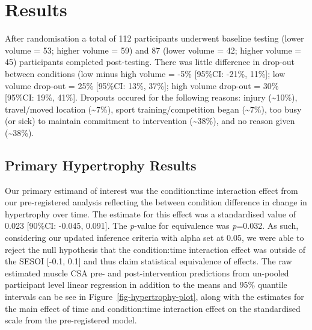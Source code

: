 \documentclass[
]{article}
\begin{document}
\section{Results}\label{results}

After randomisation a total of 112 participants underwent baseline
testing (lower volume = 53; higher volume = 59) and 87 (lower volume =
42; higher volume = 45) participants completed post-testing. There was
little difference in drop-out between conditions (low minus high volume
= -5\% {[}95\%CI: -21\%, 11\%{]}; low volume drop-out = 25\% {[}95\%CI:
13\%, 37\%{]}; high volume drop-out = 30\% {[}95\%CI: 19\%, 41\%{]}.
Dropouts occured for the following reasons: injury
(\textasciitilde10\%), travel/moved location (\textasciitilde7\%), sport
training/competition began (\textasciitilde7\%), too busy (or sick) to
maintain commitment to intervention (\textasciitilde38\%), and no reason
given (\textasciitilde38\%).

\subsection{Primary Hypertrophy
Results}\label{primary-hypertrophy-results}

Our primary estimand of interest was the condition:time interaction
effect from our pre-registered analysis reflecting the between condition
difference in change in hypertrophy over time. The estimate for this
effect was a standardised value of 0.023 {[}90\%CI: -0.045, 0.091{]}.
The \emph{p}-value for equivalence was \emph{p}=0.032. As such,
considering our updated inference criteria with alpha set at 0.05, we
were able to reject the null hypothesis that the condition:time
interaction effect was outside of the SESOI {[}-0.1, 0.1{]} and thus
claim statistical equivalence of effects. The raw estimated muscle CSA
pre- and post-intervention predictions from un-pooled participant level
linear regression in addition to the means and 95\% quantile intervals
can be see in Figure~\ref{fig-hypertrophy-plot}, along with the
estimates for the main effect of time and condition:time interaction
effect on the standardised scale from the pre-registered model.
\end{document}
